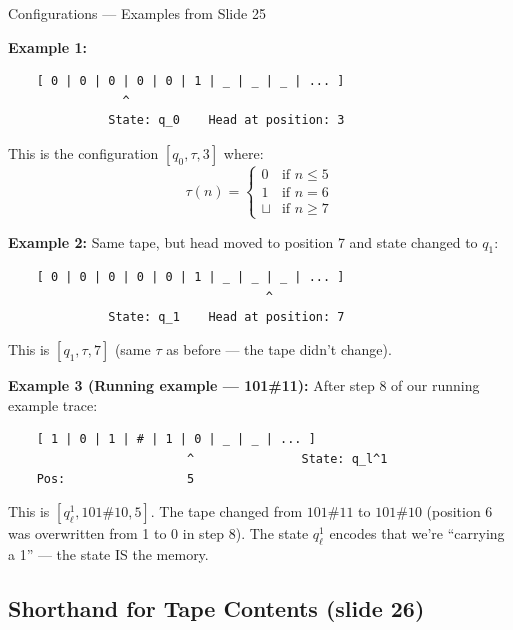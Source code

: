 \documentclass[11pt,a4paper]{article}
\begin{document}
\begin{examplebox}{Configurations --- Examples from Slide 25}

\textbf{Example 1:}
\begin{lstlisting}
    [ 0 | 0 | 0 | 0 | 0 | 1 | _ | _ | _ | ... ]
                ^
              State: q_0    Head at position: 3
\end{lstlisting}

This is the configuration $[q_0, \tau, 3]$ where:
$$\tau(n) = \begin{cases} 0 & \text{if } n \leq 5 \\ 1 & \text{if } n = 6 \\ \sqcup & \text{if } n \geq 7 \end{cases}$$

\textbf{Example 2:} Same tape, but head moved to position 7 and state changed to $q_1$:
\begin{lstlisting}
    [ 0 | 0 | 0 | 0 | 0 | 1 | _ | _ | _ | ... ]
                                    ^
              State: q_1    Head at position: 7
\end{lstlisting}

This is $[q_1, \tau, 7]$ (same $\tau$ as before --- the tape didn't change).

\vspace{0.5em}
\textbf{Example 3 (Running example --- 101\#11):} After step 8 of our running example trace:
\begin{lstlisting}
    [ 1 | 0 | 1 | # | 1 | 0 | _ | _ | ... ]
                         ^               State: q_l^1
    Pos:                 5
\end{lstlisting}
This is $[q_\ell^1, 101\#10, 5]$. The tape changed from $101\#11$ to $101\#10$ (position 6 was overwritten from 1 to 0 in step 8). The state $q_\ell^1$ encodes that we're ``carrying a 1'' --- the state IS the memory.
\end{examplebox}

\subsection{Shorthand for Tape Contents (slide 26)}
\end{document}
